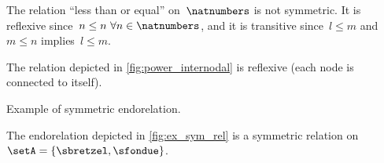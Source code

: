 \begin{example}
	The relation ``less than or equal'' on~$\natnumbers$ is not symmetric.
	It is reflexive since~$n\leq n \ \forall n\in \natnumbers$, and it is transitive since~$l\leq m$ and~$m\leq n$ implies~$l\leq m$.
\end{example}

\begin{example}
	The relation depicted in \vref{fig:power_internodal} is reflexive (each node is connected to itself).
\end{example}
\begin{marginfigure}
	\centering
	\caption{Example of symmetric endorelation.}
	\label{fig:ex_sym_rel}
\end{marginfigure}
\begin{example}
	The endorelation depicted in \vref{fig:ex_sym_rel} is a symmetric relation on~$\setA=\{\sbretzel,\sfondue\}$.
\end{example}


